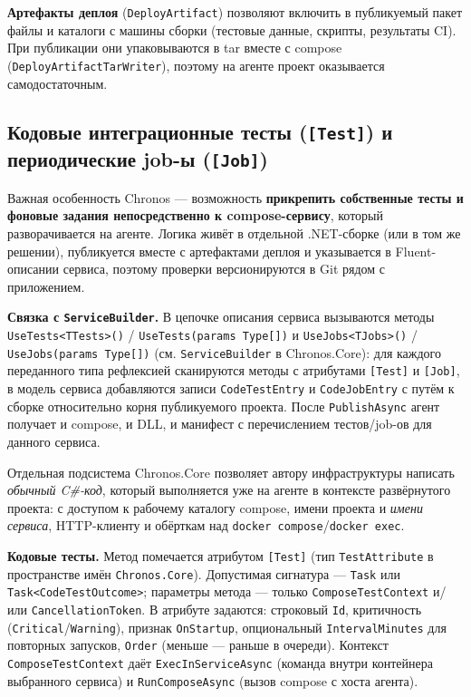 \textbf{Артефакты деплоя} (\texttt{DeployArtifact}) позволяют включить в публикуемый пакет файлы и каталоги с машины сборки (тестовые данные, скрипты, результаты CI). При публикации они упаковываются в tar вместе с compose (\texttt{DeployArtifactTarWriter}), поэтому на агенте проект оказывается самодостаточным.

\subsection{Кодовые интеграционные тесты (\texttt{[Test]}) и периодические job-ы (\texttt{[Job]})}

Важная особенность Chronos --- возможность \textbf{прикрепить собственные тесты и фоновые задания непосредственно к compose-сервису}, который разворачивается на агенте. Логика живёт в отдельной .NET-сборке (или в том же решении), публикуется вместе с артефактами деплоя и указывается в Fluent-описании сервиса, поэтому проверки версионируются в Git рядом с приложением.

\textbf{Связка с \texttt{ServiceBuilder}.} В цепочке описания сервиса вызываются методы \texttt{UseTests<\allowbreak TTests>()} / \texttt{UseTests(params Type[])} и \texttt{UseJobs<\allowbreak TJobs>()} / \texttt{UseJobs(params Type[])} (см. \texttt{ServiceBuilder} в Chronos.Core): для каждого переданного типа рефлексией сканируются методы с атрибутами \texttt{[Test]} и \texttt{[Job]}, в модель сервиса добавляются записи \texttt{CodeTestEntry} и \texttt{CodeJobEntry} с путём к сборке относительно корня публикуемого проекта. После \texttt{PublishAsync} агент получает и compose, и DLL, и манифест с перечислением тестов/job-ов для данного сервиса.

Отдельная подсистема Chronos.Core позволяет автору инфраструктуры написать \emph{обычный C\#-код}, который выполняется уже на агенте в контексте развёрнутого проекта: с доступом к рабочему каталогу compose, имени проекта и \emph{имени сервиса}, HTTP-клиенту и обёрткам над \texttt{docker compose}/\texttt{docker exec}.

\textbf{Кодовые тесты.} Метод помечается атрибутом \texttt{[Test]} (тип \texttt{TestAttribute} в пространстве имён \texttt{Chronos.Core}). Допустимая сигнатура --- \texttt{Task} или \texttt{Task<CodeTestOutcome>}; параметры метода --- только \texttt{ComposeTestContext} и/или \texttt{CancellationToken}. В атрибуте задаются: строковый \texttt{Id}, критичность (\texttt{Critical}/\texttt{Warning}), признак \texttt{OnStartup}, опциональный \texttt{IntervalMinutes} для повторных запусков, \texttt{Order} (меньше --- раньше в очереди). Контекст \texttt{ComposeTestContext} даёт \texttt{ExecInServiceAsync} (команда внутри контейнера выбранного сервиса) и \texttt{RunComposeAsync} (вызов compose с хоста агента).

